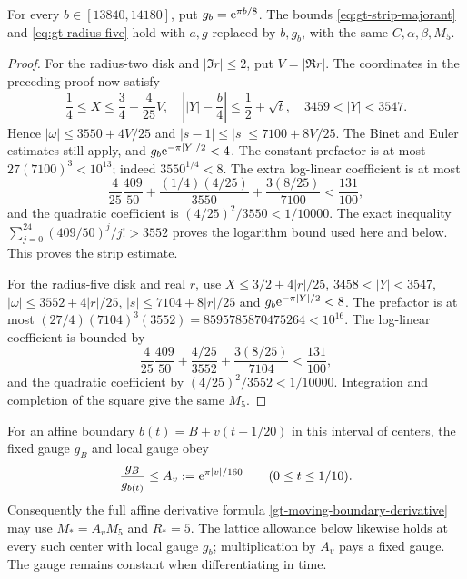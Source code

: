 \begin{corollary}
\label{gt-boundary-majorants}
For every \(b\in[13840,14180]\), put \(g_b=\mathrm e^{\pi b/8}\).
The bounds \eqref{eq:gt-strip-majorant} and \eqref{eq:gt-radius-five}
hold with \(a,g\) replaced by \(b,g_b\), with the same
\(C,\alpha,\beta,M_5\).
\end{corollary}
\begin{proof}
For the radius-two disk and \(|\Im r|\le2\), put \(V=|\Re r|\).
The coordinates in the preceding proof now satisfy
\[
 \frac14\le X\le\frac34+\frac4{25}V,\quad
 \left||Y|-\frac b4\right|\le\frac12+\sqrt t,\quad
 3459<|Y|<3547.
\]
Hence \(|\omega|\le3550+4V/25\) and
\(|s-1|\le|s|\le7100+8V/25\). The Binet and Euler estimates
still apply, and \(g_b\mathrm e^{-\pi|Y|/2}<4\).
The constant prefactor is at most \(27(7100)^3<10^{13}\);
indeed \(3550^{1/4}<8\). The extra log-linear coefficient is at most
\[
 \frac4{25}\frac{409}{50}
 +\frac{(1/4)(4/25)}{3550}
 +\frac{3(8/25)}{7100}<\frac{131}{100},
\]
and the quadratic coefficient is \((4/25)^2/3550<1/10000\).
The exact inequality
\(\sum_{j=0}^{24}(409/50)^j/j!>3552\) proves the logarithm bound
used here and below. This proves the strip estimate.

For the radius-five disk and real \(r\), use
\(X\le3/2+4|r|/25\), \(3458<|Y|<3547\),
\(|\omega|\le3552+4|r|/25\), \(|s|\le7104+8|r|/25\)
and \(g_b\mathrm e^{-\pi|Y|/2}<8\).
The prefactor is at most
\((27/4)(7104)^3(3552)=8595785870475264<10^{16}\).
The log-linear coefficient is bounded by
\[
 \frac4{25}\frac{409}{50}
 +\frac{4/25}{3552}+\frac{3(8/25)}{7104}<\frac{131}{100},
\]
and the quadratic coefficient by \((4/25)^2/3552<1/10000\).
Integration and completion of the square give the same \(M_5\).
\end{proof}

For an affine boundary \(b(t)=B+v(t-1/20)\) in this interval of
centers, the fixed gauge \(g_B\) and local gauge obey
\[
 \frac{g_B}{g_{b(t)}}\le A_v:=\mathrm e^{\pi|v|/160}
 \qquad(0\le t\le1/10).
\]
Consequently the full affine derivative formula \eqref{gt-moving-boundary-derivative}
may use \(M_*=A_vM_5\) and \(R_*=5\).
The lattice allowance below likewise holds at every such center with
local gauge \(g_b\); multiplication by \(A_v\) pays a fixed gauge.
The gauge remains constant when differentiating in time.


